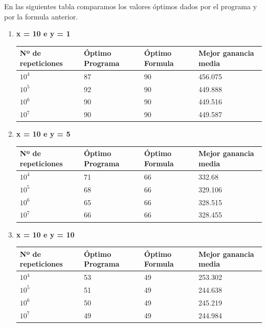 \documentclass[]{article}
\begin{document}
En las siguientes tabla comparamos los valores óptimos dados por el programa y por la formula anterior.
\begin{enumerate}
	\item \textbf{ x = 10 e y = 1}
	\begin{table}[H]
		\begin{center}
			\begin{tabular}{|l|l|l|l|}
				\hline
				Nº de repeticiones & Óptimo Programa & Óptimo Formula& Mejor ganancia media\\
				\hline \hline
				$10^{4}$ & 87 & 90 &456.075
				\\ \hline
				$10^{5}$ & 92 & 90 & 449.888
				\\ \hline
				$10^{6}$ & 90 & 90 & 449.516
				\\ \hline
				$10^{7}$ & 90 & 90 & 449.587
				\\ \hline
				
			\end{tabular}
			\label{tabla:sencilla}
		\end{center}
	\end{table}

	\item \textbf{ x = 10 e y = 5}
	\begin{table}[H]
		\begin{center}
			\begin{tabular}{|l|l|l|l|}
				\hline
				Nº de repeticiones & Óptimo Programa & Óptimo Formula & Mejor ganancia media\\
				\hline \hline
				$10^{4}$ & 71 & 66 & 332.68
				\\ \hline
				$10^{5}$ & 68 & 66 & 329.106
				\\ \hline
				$10^{6}$ & 65 & 66 & 328.515
				\\ \hline
				$10^{7}$ & 66 & 66 & 328.455
				\\ \hline
				
			\end{tabular}
			\label{tabla:sencilla}
		\end{center}
	\end{table}
	\newpage
	\item \textbf{ x = 10 e y = 10}
	\begin{table}[H]
		\begin{center}
			\begin{tabular}{|l|l|l|l|}
				\hline
				Nº de repeticiones & Óptimo Programa & Óptimo Formula& Mejor ganancia media\\
				\hline \hline
				$10^{4}$ & 53 & 49 & 253.302
				\\ \hline
				$10^{5}$ & 51 & 49 & 244.638
				\\ \hline
				$10^{6}$ & 50 & 49 & 245.219
				\\ \hline
				$10^{7}$ & 49 & 49 & 244.984
				\\ \hline
				
			\end{tabular}
			\label{tabla:sencilla}
		\end{center}
	\end{table}
	
\end{enumerate}
\end{document}
